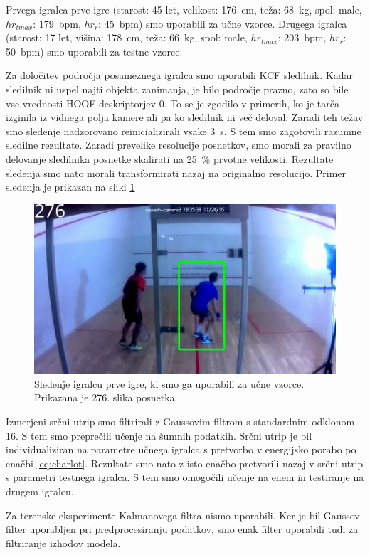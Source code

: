 Prvega igralca prve igre  (starost: 45 let, velikost: \SI{176}{\cm}, teža: \SI{68}{\kg}, spol: male, $hr_{tmax}$: \SI{179}{bpm}, $hr_{r}$: \SI{45}{bpm}) smo uporabili za učne vzorce. Drugega igralca (starost: 17 let, višina: \SI{178}{\cm}, teža: \SI{66}{\kg}, spol: male, $hr_{tmax}$: \SI{203}{bpm}, $hr_{r}$: \SI{50}{bpm}) smo uporabili za testne vzorce. 

Za določitev področja posameznega igralca smo uporabili KCF sledilnik. Kadar sledilnik ni uspel najti objekta zanimanja, je bilo področje prazno, zato so bile vse vrednosti HOOF deskriptorjev $0$. To se je zgodilo v primerih, ko je tarča izginila iz vidnega polja kamere ali pa ko sledilnik ni več deloval. Zaradi teh težav smo sledenje nadzorovano reinicializirali vsake \SI{3}{\s}. S tem smo zagotovili razumne sledilne rezultate. Zaradi prevelike resolucije posnetkov, smo morali za pravilno delovanje sledilnika posnetke skalirati na \SI{25}{\%} prvotne velikosti. Rezultate sledenja smo nato morali transformirati nazaj na originalno resolucijo. Primer sledenja je prikazan na sliki \ref{fig:sledenje-squash}

\begin{figure}[!htb]
	\centering
	\includegraphics[width=0.6\columnwidth]{./Slike/squash-tracked.png}
	\caption[Sledenje igralcu prve igre, ki smo ga uporabili za učne vzorce]{Sledenje igralcu prve igre, ki smo ga uporabili za učne vzorce. Prikazana je 276. slika posnetka.}
	\label{fig:sledenje-squash}
\end{figure}

Izmerjeni srčni utrip smo filtrirali z Gaussovim filtrom s standardnim odklonom \num{16}. S tem smo preprečili učenje na šumnih podatkih. Srčni utrip je bil individualiziran na parametre učnega igralca s pretvorbo v energijsko porabo po enačbi \eqref{eq:charlot}. Rezultate smo nato z isto enačbo pretvorili nazaj v srčni utrip s parametri testnega igralca. S tem smo omogočili učenje na enem in testiranje na drugem igralcu. 

Za terenske eksperimente Kalmanovega filtra nismo uporabili. Ker je bil Gaussov filter uporabljen pri predprocesiranju podatkov, smo enak filter uporabili tudi za filtriranje izhodov modela.


